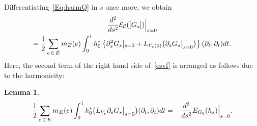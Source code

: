 \documentclass[11pt]{article}
\newtheorem{lemm}[theo]{Lemma}
\theoremstyle{definition}
\numberwithin{equation}{section}
\newcommand{\p}{\psi}
\newcommand{\Cc}{\mathcal{C}}
\newcommand{\Ec}{\mathcal{E}}
\renewcommand*\p{\partial}
\begin{document}
Differentiating~\eqref{Eq:harmQ} in $s$ once more, we obtain
\begin{multline}\label{esvf}
\frac{d^2}{d s^2}\Ec_{\Cc}([G_{s}])\Big{|}_{s=0}\\
=\frac{1}{2}\sum_{e\,\in\,E}m_E(e)\int_{0}^1h_0^*\left\{{\p_s^2}G_{s}\middle|_{s=0}+L_{V_e(0)}\big({\p_s}G_{s}\big|_{s=0}\big)\right\}(\p_{t},\p_{t})dt.
\end{multline}
Here, the second term of the right hand side of~\eqref{esvf} is arranged as follows due to the harmonicity:



\begin{lemm}
\begin{equation}\label{harm3}
\frac{1}{2}\sum_{e\,\in\,E}m_E(e)\int_{0}^1 h_0^*\big(L_{V_e}{\p_s}G_{s}\big|_{s=0}\big)(\p_{t},\p_{t})dt=-\frac{d^2}{d s^2}E_{G_{0}}(h_{s})\Big{|}_{s=0}.
\end{equation}
\end{lemm}
\end{document}

